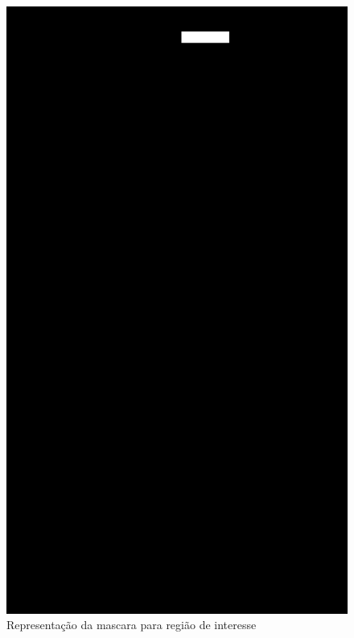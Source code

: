 \begin{figure}[H]
    \centering
    \caption{Representação da mascara para região de interesse }
        \begin{minipage}{\sizeImg\textwidth}
            \includegraphics[width=\textwidth]{figuras/ultrapassar_barra/134_mask_head.png}
        \end{minipage}
        \begin{minipage}{\sizeImg\textwidth}

\end{minipage}
\end{figure}
